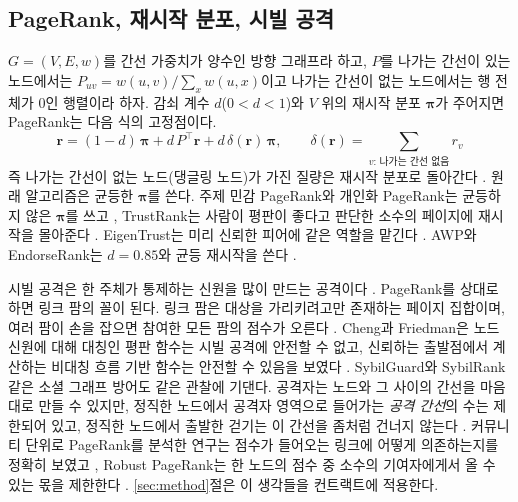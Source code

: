 \subsection{PageRank, 재시작 분포, 시빌 공격}
\label{sec:bg-pagerank}

$G=(V,E,w)$를 간선 가중치가 양수인 방향 그래프라 하고, $P$를 나가는 간선이 있는 노드에서는 $P_{uv}=w(u,v)/\sum_x w(u,x)$이고 나가는 간선이 없는 노드에서는 행 전체가 0인 행렬이라 하자. 감쇠 계수 $d$($0<d<1$)와 $V$ 위의 재시작 분포 $\boldsymbol{\pi}$가 주어지면 PageRank는 다음 식의 고정점이다.
\begin{equation}
\label{eq:pagerank}
\mathbf{r} = (1-d)\,\boldsymbol{\pi} + d\,P^{\top}\mathbf{r} + d\,\delta(\mathbf{r})\,\boldsymbol{\pi},
\qquad
\delta(\mathbf{r}) = \sum_{v:\,\text{나가는 간선 없음}} r_v
\end{equation}
즉 나가는 간선이 없는 노드(댕글링 노드)가 가진 질량은 재시작 분포로 돌아간다 \cite{page1998pagerank,langville2006google}. 원래 알고리즘은 균등한 $\boldsymbol{\pi}$를 쓴다. 주제 민감 PageRank와 개인화 PageRank는 균등하지 않은 $\boldsymbol{\pi}$를 쓰고 \cite{haveliwala2003topic,jeh2003scaling}, TrustRank는 사람이 평판이 좋다고 판단한 소수의 페이지에 재시작을 몰아준다 \cite{gyongyi2004trustrank}. EigenTrust는 미리 신뢰한 피어에 같은 역할을 맡긴다 \cite{kamvar2003eigentrust}. AWP와 EndorseRank는 $d=0.85$와 균등 재시작을 쓴다 \cite{do2023awp,kwon2026endorserank}.

시빌 공격은 한 주체가 통제하는 신원을 많이 만드는 공격이다 \cite{douceur2002sybil}. PageRank를 상대로 하면 링크 팜의 꼴이 된다. 링크 팜은 대상을 가리키려고만 존재하는 페이지 집합이며, 여러 팜이 손을 잡으면 참여한 모든 팜의 점수가 오른다 \cite{gyongyi2005alliances}. Cheng과 Friedman은 노드 신원에 대해 대칭인 평판 함수는 시빌 공격에 안전할 수 없고, 신뢰하는 출발점에서 계산하는 비대칭 흐름 기반 함수는 안전할 수 있음을 보였다 \cite{cheng2005sybilproof}. SybilGuard와 SybilRank 같은 소셜 그래프 방어도 같은 관찰에 기댄다. 공격자는 노드와 그 사이의 간선을 마음대로 만들 수 있지만, 정직한 노드에서 공격자 영역으로 들어가는 \emph{공격 간선}의 수는 제한되어 있고, 정직한 노드에서 출발한 걷기는 이 간선을 좀처럼 건너지 않는다 \cite{yu2006sybilguard,cao2012sybilrank}. 커뮤니티 단위로 PageRank를 분석한 연구는 점수가 들어오는 링크에 어떻게 의존하는지를 정확히 보였고 \cite{bianchini2005inside}, Robust PageRank는 한 노드의 점수 중 소수의 기여자에게서 올 수 있는 몫을 제한한다 \cite{andersen2008robust}. \ref{sec:method}절은 이 생각들을 컨트랙트에 적용한다.
